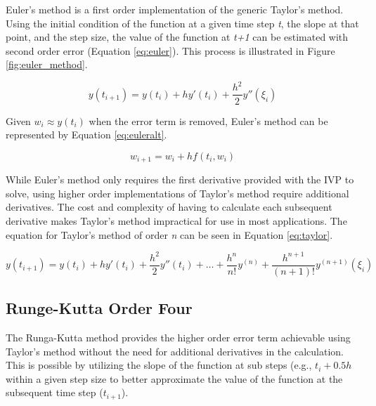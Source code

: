 \documentclass{article}
\begin{document}
Euler's method is a first order implementation of the generic Taylor's method. Using the initial condition of the function at a given time step \textit{t}, the slope at that point, and the step size, the value of the function at \textit{t+1} can be estimated with second order error (Equation \ref{eq:euler}). This process is illustrated in Figure \ref{fig:euler_method}.

\begin{center}
	\begin{equation}
	y(t_{i+1}) = y(t_i) + hy'(t_i)+\frac{h^2}{2}y''(\xi_i) 
	\label{eq:euler}
	\end{equation}
\end{center}

Given $w_i \approx y(t_i)$ when the error term is removed, Euler's method can be represented by Equation \ref{eq:euleralt}.


\begin{center}
	\begin{equation}
	w_{i+1} = w_i + hf(t_i, w_i)
	\label{eq:euleralt}
	\end{equation}
\end{center}

While Euler's method only requires the first derivative provided with the IVP to solve, using higher order implementations of Taylor's method require additional derivatives. The cost and complexity of having to calculate each subsequent derivative makes Taylor's method impractical for use in most applications. The equation for Taylor's method of order \textit{n} can be seen in Equation \ref{eq:taylor}.

\begin{center}
	\begin{equation}
	y(t_{i+1}) = y(t_i) + hy'(t_i)+\frac{h^2}{2}y''(t_i) + \dots + \frac{h^n}{n!}y^{(n)} + \frac{h^{n+1}}{(n+1)!}y^{(n+1)}(\xi_i) 
	\label{eq:taylor}
	\end{equation}
\end{center}


\subsection{Runge-Kutta Order Four}
\label{method:rk}

The Runga-Kutta method provides the higher order error term achievable using Taylor's method without the need for additional derivatives in the calculation. This is possible by utilizing the slope of the function at sub steps (e.g., $t_i+0.5h$ within a given step size to better approximate the value of the function at the subsequent time step ($t_{i+1}$).
\end{document}
